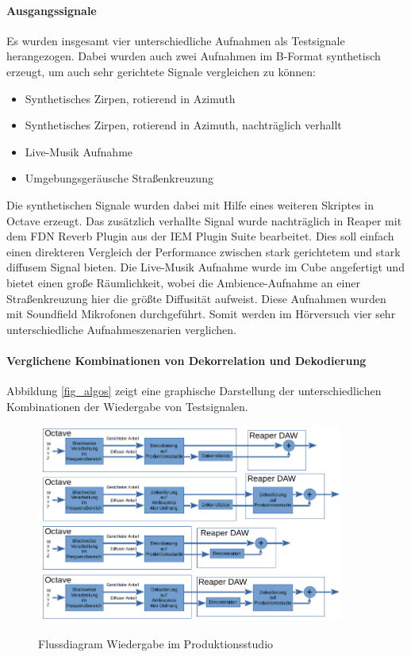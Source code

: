 \paragraph{Ausgangssignale}
Es wurden insgesamt vier unterschiedliche Aufnahmen als Testsignale herangezogen. Dabei wurden auch zwei Aufnahmen im B-Format synthetisch erzeugt, um auch sehr gerichtete Signale vergleichen zu können:

\begin{itemize}
	\item Synthetisches Zirpen, rotierend in Azimuth
	\item Synthetisches Zirpen, rotierend in Azimuth, nachträglich verhallt
	\item Live-Musik Aufnahme
	\item Umgebungsgeräusche Straßenkreuzung
\end{itemize}

Die synthetischen Signale wurden dabei mit Hilfe eines weiteren Skriptes in Octave erzeugt. Das zusätzlich verhallte Signal wurde nachträglich in Reaper mit dem FDN Reverb Plugin aus der IEM Plugin Suite bearbeitet. Dies soll einfach einen direkteren Vergleich der Performance zwischen stark gerichtetem und stark diffusem Signal bieten. Die Live-Musik Aufnahme wurde im Cube angefertigt und bietet einen große Räumlichkeit, wobei die Ambience-Aufnahme an einer Straßenkreuzung hier die größte Diffusität aufweist. Diese Aufnahmen wurden mit Soundfield Mikrofonen durchgeführt. Somit werden im Hörversuch vier sehr unterschiedliche Aufnahmeszenarien verglichen.

\paragraph{Verglichene Kombinationen von Dekorrelation und Dekodierung}
Abbildung \ref{fig_algos} zeigt eine graphische Darstellung der unterschiedlichen Kombinationen der Wiedergabe von Testsignalen.

\begin{figure}[!ht]
  \centering
  \includegraphics[width=0.9\textwidth]{aufbau/plots/algos.png}
  \label{fig:algos}
  \caption{Flussdiagram Wiedergabe im Produktionsstudio}
\end{figure}

